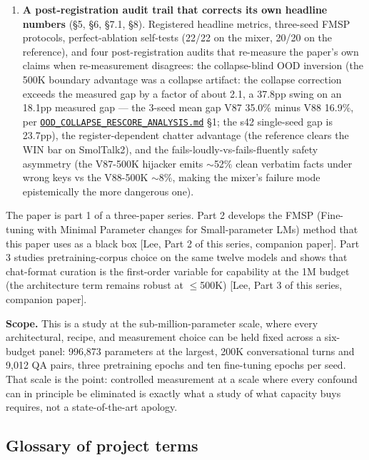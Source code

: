 \documentclass[11pt]{article}
\begin{document}
\begin{enumerate}
\item \textbf{A post-registration audit trail that corrects its own headline numbers} (\S5, \S6, \S7.1, \S8). Registered headline metrics, three-seed FMSP protocols, perfect-ablation self-tests (22/22 on the mixer, 20/20 on the reference), and four post-registration audits that re-measure the paper's own claims when re-measurement disagrees: the collapse-blind OOD inversion (the 500K boundary advantage was a collapse artifact: the collapse correction exceeds the measured gap by a factor of about 2.1, a 37.8pp swing on an 18.1pp measured gap --- the 3-seed mean gap V87 35.0\% minus V88 16.9\%, per \href{https://github.com/llaa33219/MicroMixer-4/blob/4bb630413dfa58ef3141291e121ab8c006d03235/OOD_COLLAPSE_RESCORE_ANALYSIS.md}{\texttt{OOD\_COLLAPSE\_RESCORE\_ANALYSIS.md}} \S1; the s42 single-seed gap is 23.7pp), the register-dependent chatter advantage (the reference clears the WIN bar on SmolTalk2), and the fails-loudly-vs-fails-fluently safety asymmetry (the V87-500K hijacker emits $\sim$52\% clean verbatim facts under wrong keys vs the V88-500K $\sim$8\%, making the mixer's failure mode epistemically the more dangerous one).
\end{enumerate}

The paper is part 1 of a three-paper series. Part 2 develops the FMSP (Fine-tuning with Minimal Parameter changes for Small-parameter LMs) method that this paper uses as a black box [Lee, Part 2 of this series, companion paper]. Part 3 studies pretraining-corpus choice on the same twelve models and shows that chat-format curation is the first-order variable for capability at the 1M budget (the architecture term remains robust at $\leq$500K) [Lee, Part 3 of this series, companion paper].

\textbf{Scope.} This is a study at the sub-million-parameter scale, where every architectural, recipe, and measurement choice can be held fixed across a six-budget panel: 996,873 parameters at the largest, 200K conversational turns and 9,012 QA pairs, three pretraining epochs and ten fine-tuning epochs per seed. That scale is the point: controlled measurement at a scale where every confound can in principle be eliminated is exactly what a study of what capacity buys requires, not a state-of-the-art apology.

\subsection{Glossary of project terms}
\end{document}
